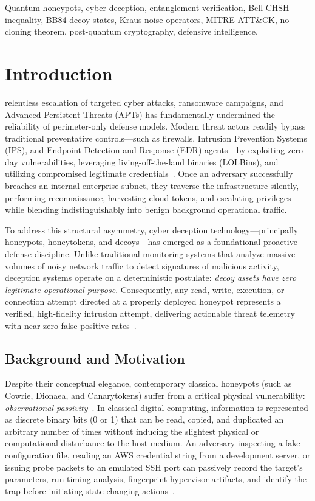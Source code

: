 \documentclass[journal,10pt]{IEEEtran}
\begin{document}
\begin{IEEEkeywords}
Quantum honeypots, cyber deception, entanglement verification, Bell-CHSH inequality, BB84 decoy states, Kraus noise operators, MITRE ATT\&CK, no-cloning theorem, post-quantum cryptography, defensive intelligence.
\end{IEEEkeywords}

\section{Introduction}
 relentless escalation of targeted cyber attacks, ransomware campaigns, and Advanced Persistent Threats (APTs) has fundamentally undermined the reliability of perimeter-only defense models. Modern threat actors readily bypass traditional preventative controls---such as firewalls, Intrusion Prevention Systems (IPS), and Endpoint Detection and Response (EDR) agents---by exploiting zero-day vulnerabilities, leveraging living-off-the-land binaries (LOLBins), and utilizing compromised legitimate credentials~\cite{wang2024quantum}. Once an adversary successfully breaches an internal enterprise subnet, they traverse the infrastructure silently, performing reconnaissance, harvesting cloud tokens, and escalating privileges while blending indistinguishably into benign background operational traffic.

To address this structural asymmetry, cyber deception technology---principally honeypots, honeytokens, and decoys---has emerged as a foundational proactive defense discipline. Unlike traditional monitoring systems that analyze massive volumes of noisy network traffic to detect signatures of malicious activity, deception systems operate on a deterministic postulate: \emph{decoy assets have zero legitimate operational purpose}. Consequently, any read, write, execution, or connection attempt directed at a properly deployed honeypot represents a verified, high-fidelity intrusion attempt, delivering actionable threat telemetry with near-zero false-positive rates~\cite{gupta2024canary}.

\subsection{Background and Motivation}
Despite their conceptual elegance, contemporary classical honeypots (such as Cowrie, Dionaea, and Canarytokens) suffer from a critical physical vulnerability: \emph{observational passivity}~\cite{zhao2024adversarial}. In classical digital computing, information is represented as discrete binary bits (0 or 1) that can be read, copied, and duplicated an arbitrary number of times without inducing the slightest physical or computational disturbance to the host medium. An adversary inspecting a fake configuration file, reading an AWS credential string from a development server, or issuing probe packets to an emulated SSH port can passively record the target's parameters, run timing analysis, fingerprint hypervisor artifacts, and identify the trap before initiating state-changing actions~\cite{alvarez2024quantum}.
\end{document}
